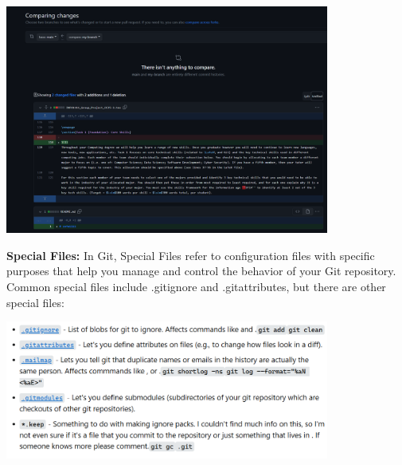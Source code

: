 \documentclass[a4paper, 11pt]{report}
\begin{document}
\begin{center}
	\includegraphics[width=0.8\textwidth, keepaspectratio]{compare}
\end{center}

\textbf{Special Files:}
\noindent In Git, Special Files refer to configuration files with specific purposes that help you manage and control the behavior of your Git repository. Common special files include .gitignore and .gitattributes, but there are other special files: 
\begin{center}
	\includegraphics[width=0.8\textwidth, keepaspectratio]{specialfile.png}
\end{center}
\end{document}
